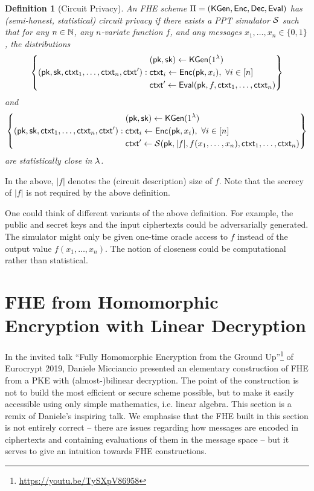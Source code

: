 \documentclass[10pt,twoside]{article}
\newtheorem{definition}[theorem]{Definition}
\newcommand{\ctxt}{\mathsf{ctxt}}
\newcommand{\bits}[1][]{\{0,1\}^{#1}}
\begin{document}
\begin{definition}[Circuit Privacy]
    An FHE scheme $\Pi = (\mathsf{KGen},\mathsf{Enc},\mathsf{Dec},\mathsf{Eval})$ has (semi-honest, statistical) circuit privacy if there exists a PPT simulator $\mathcal{S}$ such that for any $n \in \mathbb{N}$, any $n$-variate function $f$, and any messages $x_1, \ldots, x_n \in \bits$, the distributions
    \begin{align*}
        \set{
        (\pk, \sk, \ctxt_1, \ldots, \ctxt_n, \ctxt'):
        \begin{aligned}
            &(\pk,\sk) \gets \kgen(\secparam) \\
            &\ctxt_i \gets \enc(\pk, x_i),~\forall i \in [n] \\
            &\ctxt' \gets \eval(\pk, f, \ctxt_1, \ldots, \ctxt_n)
        \end{aligned}
        }
    \end{align*}
    and
    \begin{align*}
        \set{
        (\pk, \sk, \ctxt_1, \ldots, \ctxt_n, \ctxt'):
        \begin{aligned}
            &(\pk,\sk) \gets \kgen(\secparam) \\
            &\ctxt_i \gets \enc(\pk, x_i),~\forall i \in [n] \\
            &\ctxt' \gets \sdv(\pk, |f|, f(x_1, \ldots, x_n), \ctxt_1, \ldots, \ctxt_n)
        \end{aligned}
        }
    \end{align*}
    are statistically close in $\lambda$.
\end{definition}

In the above, $|f|$ denotes the (circuit description) size of $f$. Note that the secrecy of $|f|$ is not required by the above definition.

One could think of different variants of the above definition.
For example, the public and secret keys and the input ciphertexts could be adversarially generated.
The simulator might only be given one-time oracle access to $f$ instead of the output value $f(x_1, \ldots, x_n)$.
The notion of closeness could be computational rather than statistical.

\section{FHE from Homomorphic Encryption with Linear Decryption}

In the invited talk ``Fully Homomorphic Encryption from the Ground Up''\footnote{\url{https://youtu.be/TySXpV86958}} of Eurocrypt 2019, Daniele Micciancio presented an elementary construction of FHE from a PKE with (almost-)bilinear decryption.
The point of the construction is not to build the most efficient or secure scheme possible, but to make it easily accessible using only simple mathematics, i.e. linear algebra.
This section is a remix of Daniele's inspiring talk.
We emphasise that the FHE built in this section is not entirely correct -- there are issues regarding how messages are encoded in ciphertexts and containing evaluations of them in the message space -- but it serves to give an intuition towards FHE constructions.
\end{document}
